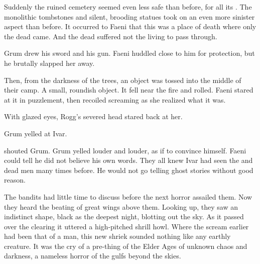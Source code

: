 
Suddenly the ruined cemetery seemed even less safe than before, for all its \eidola. 
The monolithic tombstones and silent, brooding statues took on an even more sinister aspect than before. 
It occurred to Faeni that this was a place of death where only the dead came. 
And the dead suffered not the living to pass through. 


Grum drew his sword and his gun. 
Faeni huddled close to him for protection, but he brutally slapped her away. 

Then, from the darkness of the trees, an object was tossed into the middle of their camp. 
A small, roundish object. 
It fell near the fire and rolled. 
Faeni stared at it in puzzlement, then recoiled screaming as she realized what it was. 

With glazed eyes, Rogg's severed head stared back at her. 

 Grum yelled at Ivar. 




 shouted Grum. 
Grum yelled louder and louder, as if to convince himself. 
Faeni could tell he did not believe his own words. 
They all knew Ivar had seen the \wylde and dead men many times before. 
He would not go telling ghost stories without good reason. 

The bandits had little time to discuss before the next horror assailed them. 
Now they heard the beating of great wings above them. 
Looking up, they saw an indistinct shape, black as the deepest night, blotting out the sky.
As it passed over the clearing it uttered a high-pitched shrill howl.
Where the scream earlier had been that of a man, this new shriek sounded nothing like any earthly creature. 
It was the cry of a pre-\human thing of the Elder Ages of unknown chaos and darkness, a nameless horror of the gulfs beyond the skies. 

